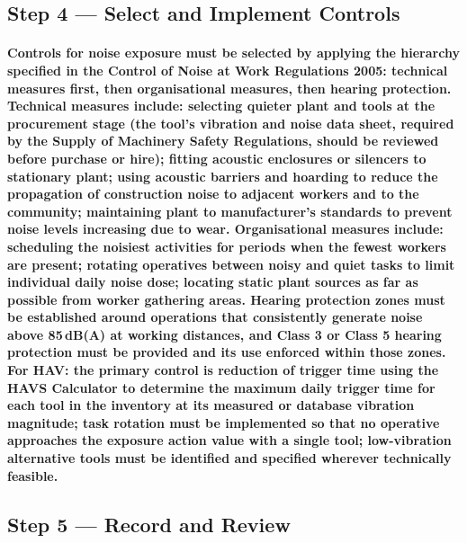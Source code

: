 \subsection{Step 4 --- Select and Implement Controls}
\paragraph{Controls for noise exposure must be selected by applying the hierarchy specified in the Control of Noise at Work Regulations 2005: technical measures first, then organisational measures, then hearing protection. Technical measures include: selecting quieter plant and tools at the procurement stage (the tool's vibration and noise data sheet, required by the Supply of Machinery Safety Regulations, should be reviewed before purchase or hire); fitting acoustic enclosures or silencers to stationary plant; using acoustic barriers and hoarding to reduce the propagation of construction noise to adjacent workers and to the community; maintaining plant to manufacturer's standards to prevent noise levels increasing due to wear. Organisational measures include: scheduling the noisiest activities for periods when the fewest workers are present; rotating operatives between noisy and quiet tasks to limit individual daily noise dose; locating static plant sources as far as possible from worker gathering areas. Hearing protection zones must be established around operations that consistently generate noise above 85\,dB(A) at working distances, and Class 3 or Class 5 hearing protection must be provided and its use enforced within those zones. For HAV: the primary control is reduction of trigger time using the HAVS Calculator to determine the maximum daily trigger time for each tool in the inventory at its measured or database vibration magnitude; task rotation must be implemented so that no operative approaches the exposure action value with a single tool; low-vibration alternative tools must be identified and specified wherever technically feasible.}

\subsection{Step 5 --- Record and Review}

